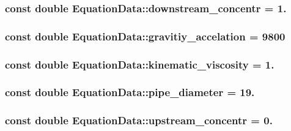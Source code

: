 \subsubsection[{downstream\+\_\+concentr}]{\setlength{\rightskip}{0pt plus 5cm}const double Equation\+Data\+::downstream\+\_\+concentr = 1.}\label{namespace_equation_data_a4ae0be08a5d532f2c298df33760cb50e}
\hypertarget{namespace_equation_data_aaa67c6160039911ad0a48e345082d6c7}{}
\subsubsection[{gravitiy\+\_\+accelation}]{\setlength{\rightskip}{0pt plus 5cm}const double Equation\+Data\+::gravitiy\+\_\+accelation = 9800}\label{namespace_equation_data_aaa67c6160039911ad0a48e345082d6c7}
\hypertarget{namespace_equation_data_a87e6c1ce019dcf40290b9149bf65065b}{}
\subsubsection[{kinematic\+\_\+viscosity}]{\setlength{\rightskip}{0pt plus 5cm}const double Equation\+Data\+::kinematic\+\_\+viscosity = 1.}\label{namespace_equation_data_a87e6c1ce019dcf40290b9149bf65065b}
\hypertarget{namespace_equation_data_a8a2de541b8b542073fd84d608d36994a}{}
\subsubsection[{pipe\+\_\+diameter}]{\setlength{\rightskip}{0pt plus 5cm}const double Equation\+Data\+::pipe\+\_\+diameter = 19.}\label{namespace_equation_data_a8a2de541b8b542073fd84d608d36994a}
\hypertarget{namespace_equation_data_a104382ed0befd669cf5ec81dfa13425e}{}
\subsubsection[{upstream\+\_\+concentr}]{\setlength{\rightskip}{0pt plus 5cm}const double Equation\+Data\+::upstream\+\_\+concentr = 0.}\label{namespace_equation_data_a104382ed0befd669cf5ec81dfa13425e}
